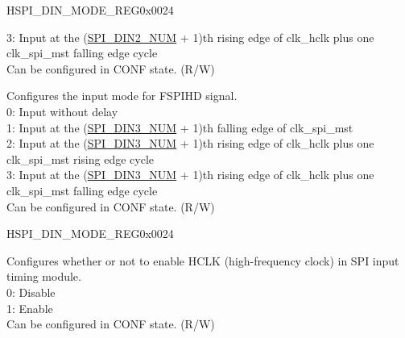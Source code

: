 \begin{register}{H}{SPI\_DIN\_MODE\_REG}{0x0024}
\begin{regdesc}
\begin{reglist}
3: Input at the (\hyperref[fielddesc:SPIDIN2NUM]{SPI\_DIN2\_NUM} + 1)th rising edge of clk\_hclk plus one clk\_spi\_mst falling edge cycle \\
Can be configured in CONF state. (R/W)
\label{fielddesc:SPIDIN3MODE}\item [SPI\_DIN3\_MODE] Configures the input mode for FSPIHD signal. \\
0: Input without delay \\
1: Input at the (\hyperref[fielddesc:SPIDIN3NUM]{SPI\_DIN3\_NUM} + 1)th falling edge of clk\_spi\_mst \\
2: Input at the (\hyperref[fielddesc:SPIDIN3NUM]{SPI\_DIN3\_NUM} + 1)th rising edge of clk\_hclk plus one clk\_spi\_mst rising edge cycle \\
3: Input at the (\hyperref[fielddesc:SPIDIN3NUM]{SPI\_DIN3\_NUM} + 1)th rising edge of clk\_hclk plus one clk\_spi\_mst falling edge cycle \\
Can be configured in CONF state. (R/W)

\item [Continued on the next page...]
\end{reglist}\end{regdesc}
\end{register}

\addtocounter{Regfloat}{-1}
\begin{register}{H}{SPI\_DIN\_MODE\_REG}{0x0024}
\begin{regdesc}\begin{reglist}
\item [Continued from the previous page...]

\label{fielddesc:SPITIMINGHCLKACTIVE}\item [SPI\_TIMING\_HCLK\_ACTIVE] Configures whether or not to enable HCLK (high-frequency clock) in SPI input timing module. \\
0: Disable \\
1: Enable \\
Can be configured in CONF state. (R/W)
\end{reglist}\end{regdesc}
\end{register}



